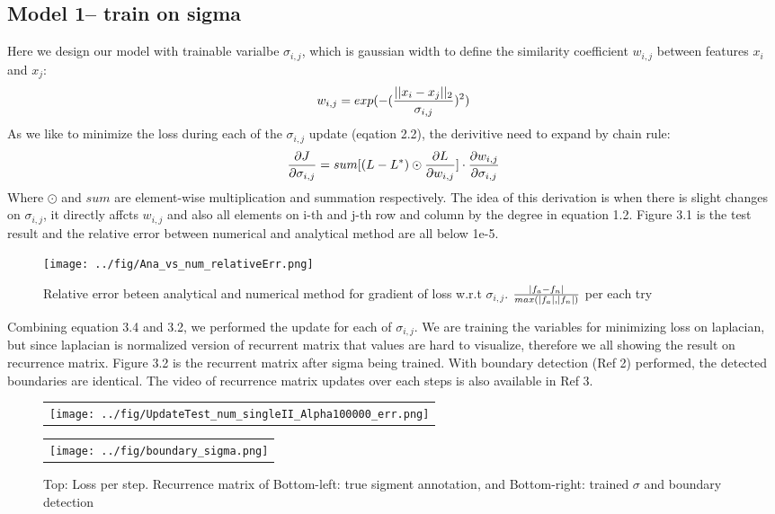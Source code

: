 \documentclass[final]{siamltexmm}
\begin{document}
\subsection{Model 1-- train on sigma}
Here we design our model with trainable varialbe $\sigma_{i,j}$, which is gaussian width to define the similarity coefficient $w_{i,j}$ between features $x_i$ and $x_j$:
\begin{equation}
w_{i,j} = exp(- ({|| x_i - x_j ||_2 \over \sigma_{i,j} })^2)
\end{equation}
As we like to minimize the loss during each of the $\sigma_{i,j}$ update (eqation 2.2), the derivitive need to expand by chain rule:
\begin{equation}
{\partial J \over \partial \sigma_{i,j}} = sum[(L - L^{\ast}) \odot {\partial L \over \partial w_{i,j}}] \cdot {\partial w_{i,j} \over \partial \sigma_{i,j}}
\end{equation}
Where $\odot$ and $sum$ are element-wise multiplication and summation respectively. The idea of this derivation is when there is slight changes on $\sigma_{i,j}$, it directly affcts $w_{i,j}$ and also all elements on i-th and j-th row and column by the degree in equation 1.2. Figure 3.1 is the test result and the relative error between numerical and analytical method are all below 1e-5.
\begin{figure}[H]
  \centering
    \texttt{[image: ../fig/Ana\_vs\_num\_relativeErr.png]}
  \caption{Relative error beteen analytical and numerical method for gradient of loss w.r.t $\sigma_{i,j}$. $|f_a - f_n| \over max(|f_a|, |f_n|)$ per each try}
\end{figure}
Combining equation 3.4 and 3.2, we performed the update for each of $\sigma_{i,j}$. We are training the variables for minimizing loss on laplacian, but since laplacian is normalized version of recurrent matrix that values are hard to visualize, therefore we all showing the result on recurrence matrix. Figure 3.2 is the recurrent matrix after sigma being trained. With boundary detection (Ref 2) performed, the detected boundaries are identical. The video of recurrence matrix updates over each steps is also available in Ref 3.
\begin{figure}[H]
\centering
\begin{subfigure}
  \begin{tabular}{c}
  \texttt{[image: ../fig/UpdateTest\_num\_singleII\_Alpha100000\_err.png]}
  \end{tabular}{}
\end{subfigure}
  \begin{tabular}{c}
  \texttt{[image: ../fig/boundary\_sigma.png]}
  \end{tabular}{}
\begin{subfigure}
\end{subfigure}
\caption{Top: Loss per step. Recurrence matrix of Bottom-left: true sigment annotation, and Bottom-right: trained $\sigma$ and boundary detection}
\end{figure}
\end{document}
